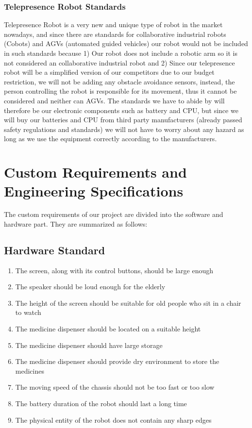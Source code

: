 \documentclass[12pt]{article}
\begin{document}
\subsubsection{Telepresence Robot Standards}
Telepresence Robot is a very new and unique type of robot in the market nowadays, and since there are standards for collaborative industrial robots (Cobots) and AGVs (automated guided vehicles) our robot would not be included in such standards because 1) Our robot does not include a robotic arm so it is not considered an collaborative industrial robot and 2) Since our telepresence robot will be a simplified version of our competitors due to our budget restriction, we will not be adding any obstacle avoidance sensors, instead, the person controlling the robot is responsible for its movement, thus it cannot be considered and neither can AGVs. The standards we have to abide by will therefore be our electronic components such as battery and CPU, but since we will buy our batteries and CPU from third party manufacturers (already passed safety regulations and standards) we will not have to worry about any hazard as long as we use the equipment correctly according to the manufacturers.

\section{Custom Requirements and Engineering Specifications}
The custom requirements of our project are divided into the software and hardware part. They are summarized as follows:
\subsection{Hardware Standard}
\begin{enumerate}
	\item The screen, along with its control buttons, should be large enough 
	\item The speaker should be loud enough for the elderly 
	\item The height of the screen should be suitable for old people who sit in a chair to watch 
	\item The medicine dispenser should be located on a suitable height 
	\item The medicine dispenser should have large storage 
	\item The medicine dispenser should provide dry environment to store the medicines
	\item The moving speed of the chassis should not be too fast or too slow
	\item The battery duration of the robot should last a long time 
	\item The physical entity of the robot does not contain any sharp edges 
\end{enumerate}
\end{document}
